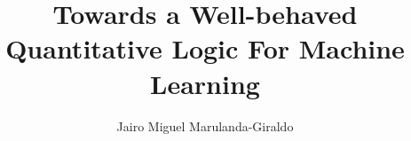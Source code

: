 \documentclass[sigplan, screen, review, nonacm]{acmart}
\begin{document}
\title{Towards a Well-behaved Quantitative Logic For Machine Learning}

\author{Jairo Miguel Marulanda-Giraldo}

\begin{comment}
\author{Ekaterina Komendantskaya}
\email{E.Komendantskaya@soton.ac.uk}
\affiliation{%
  \institution{University of Southampton \and Heriot-Watt University}
  \country{UK}
}

\author{Alessandro Bruni}
\email{brun@itu.dk}
\affiliation{%
  \institution{IT-University of Copenhagen}
  \country{Denmark}
}

\author{Reynald Affeldt}
\email{reynald.affeldt@aist.go.jp}
\affiliation{%
  \institution{National Institute of Advanced Industrial Science and Technology (AIST)}
  \country{Japan}
}

\author{Matteo Capucci}
\email{ matteo.capucci@gmail.com}
\affiliation{%
  \institution{Independent Researcher}
  \country{Italy}
}

\author{Enrico Marchioni}
\email{ e.marchioni@soton.ac.uk}
\affiliation{%
  \institution{University of Southampton}
  \country{UK}
}
\end{comment}

\renewcommand{\shortauthors}{Jairo M.\ Marulanda-Giraldo et al.}
\end{document}
